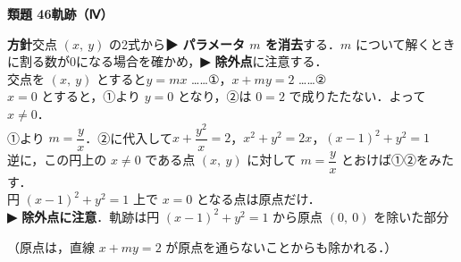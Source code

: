 \documentclass[a4paper,11pt]{ltjsarticle}
\newcommand{\ans}[2]{\Needspace{5\baselineskip}\vspace{6pt}%
  {\sffamily\bfseries 類題 #1\quad #2}\par}
\newcommand{\point}[1]{\textsf{\bfseries ▶ #1}}
\newcommand{\ax}[4]{\draw[->] (#1,0)--(#2,0) node[right]{\scriptsize $x$};
  \draw[->] (0,#3)--(0,#4) node[above]{\scriptsize $y$};
  \node[below left] at (0,0){\scriptsize O};}
\begin{document}
\ans{46}{軌跡（Ⅳ）}
\begin{kai}
\textbf{方針}\quad 交点 $(x,\ y)$ の2式から\point{パラメータ $m$ を消去}する．$m$ について解くときに割る数が0になる場合を確かめ，\point{除外点}に注意する．\\[2pt]
交点を $(x,\ y)$ とすると\quad $y=mx$ ……①，\quad $x+my=2$ ……②\\[2pt]
$x=0$ とすると，①より $y=0$ となり，②は $0=2$ で成りたたない．よって $x\neq0$．\\
①より $m=\dfrac yx$．②に代入して\quad $x+\dfrac{y^2}x=2$，\quad $x^2+y^2=2x$，\quad $(x-1)^2+y^2=1$\\[2pt]
逆に，この円上の $x\neq0$ である点 $(x,\ y)$ に対して $m=\dfrac yx$ とおけば①②をみたす．\\
円 $(x-1)^2+y^2=1$ 上で $x=0$ となる点は原点だけ．\\[2pt]
\point{除外点に注意}．軌跡は\quad 円 $(x-1)^2+y^2=1$ から原点 $(0,\ 0)$ を除いた部分\\
\begin{center}
\end{center}
（原点は，直線 $x+my=2$ が原点を通らないことからも除かれる．）
\end{kai}
\end{document}
